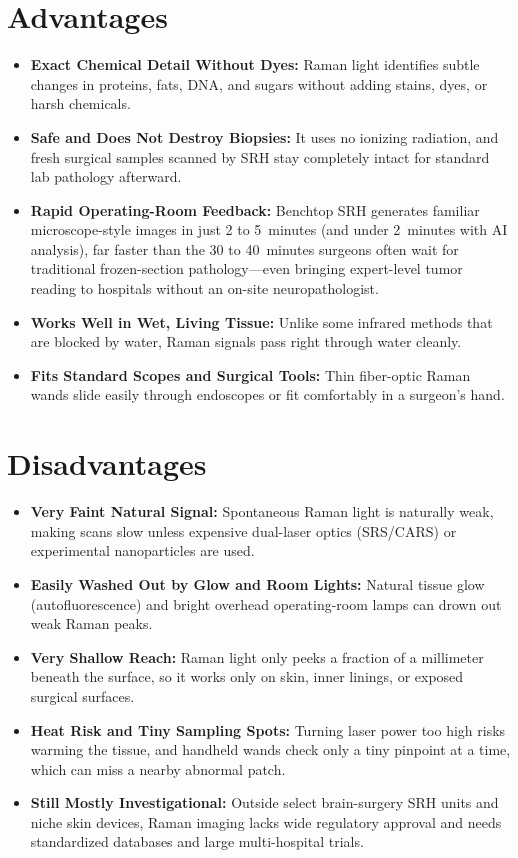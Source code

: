 \section{Advantages}
\begin{itemize}
  \item \textbf{Exact Chemical Detail Without Dyes:} Raman light identifies subtle changes in proteins, fats, DNA, and sugars without adding stains, dyes, or harsh chemicals.
  \item \textbf{Safe and Does Not Destroy Biopsies:} It uses no ionizing radiation, and fresh surgical samples scanned by SRH stay completely intact for standard lab pathology afterward.
  \item \textbf{Rapid Operating-Room Feedback:} Benchtop SRH generates familiar microscope-style images in just 2 to 5~minutes (and under 2~minutes with AI analysis), far faster than the 30 to 40~minutes surgeons often wait for traditional frozen-section pathology---even bringing expert-level tumor reading to hospitals without an on-site neuropathologist.
  \item \textbf{Works Well in Wet, Living Tissue:} Unlike some infrared methods that are blocked by water, Raman signals pass right through water cleanly.
  \item \textbf{Fits Standard Scopes and Surgical Tools:} Thin fiber-optic Raman wands slide easily through endoscopes or fit comfortably in a surgeon's hand.
\end{itemize}

\section{Disadvantages}
\begin{itemize}
  \item \textbf{Very Faint Natural Signal:} Spontaneous Raman light is naturally weak, making scans slow unless expensive dual-laser optics (SRS/CARS) or experimental nanoparticles are used.
  \item \textbf{Easily Washed Out by Glow and Room Lights:} Natural tissue glow (autofluorescence) and bright overhead operating-room lamps can drown out weak Raman peaks.
  \item \textbf{Very Shallow Reach:} Raman light only peeks a fraction of a millimeter beneath the surface, so it works only on skin, inner linings, or exposed surgical surfaces.
  \item \textbf{Heat Risk and Tiny Sampling Spots:} Turning laser power too high risks warming the tissue, and handheld wands check only a tiny pinpoint at a time, which can miss a nearby abnormal patch.
  \item \textbf{Still Mostly Investigational:} Outside select brain-surgery SRH units and niche skin devices, Raman imaging lacks wide regulatory approval and needs standardized databases and large multi-hospital trials.
\end{itemize}

